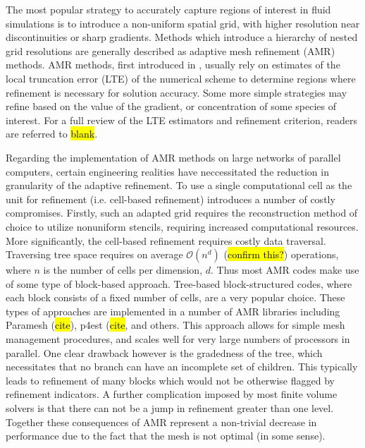 \documentclass[]{article}
\begin{document}
    The most popular strategy to accurately capture regions of interest in fluid
    simulations is to introduce a non-uniform spatial grid, with higher
    resolution near discontinuities or sharp gradients.  Methods which introduce
    a hierarchy of nested grid resolutions are generally described as adaptive
    mesh refinement (AMR) methods. AMR methods, first introduced in
    \cite{berger1984}, usually rely on estimates of the local truncation error
    (LTE) of the numerical scheme to determine regions where refinement is
    necessary for solution accuracy. Some more simple strategies may refine
    based on the value of the gradient, or concentration of some species of
    interest. For a full review of the LTE estimators and refinement criterion,
    readers are referred to \hl{blank}.

    Regarding the implementation of AMR methods on large networks of parallel
    computers, certain engineering realities have neccessitated the reduction in
    granularity of the adaptive refinement. To use a single computational cell
    as the unit for refinement (i.e. cell-based refinement) introduces a number
    of costly compromises. Firstly, such an adapted grid requires the
    reconstruction method of choice to utilize nonuniform stencils, requiring
    increased computational resources. More significantly, the cell-based
    refinement requires costly data traversal. Traversing tree space requires on
    average $\mathcal{O}(n^d)$ (\hl{confirm this?}) operations, where $n$ is the
    number of cells per dimension, $d$. Thus most AMR codes make use of some
    type of block-based approach. Tree-based block-structured codes, where each
    block consists of a fixed number of cells, are a very popular choice. These
    types of approaches are implemented in a number of AMR libraries including
    Paramesh (\hl{cite}), p4est (\hl{cite}, and others. This approach allows for
    simple mesh management procedures, and scales well for very large numbers of
    processors in parallel.  One clear drawback however is the gradedness of the
    tree, which necessitates that no branch can have an incomplete set of
    children. This typically leads to refinement of many blocks which would not
    be otherwise flagged by refinement indicators. A further complication
    imposed by most finite volume solvers is that there can not be a jump in
    refinement greater than one level. Together these consequences of AMR
    represent a non-trivial decrease in performance due to the fact that the
    mesh is not optimal (in some sense).
\end{document}
